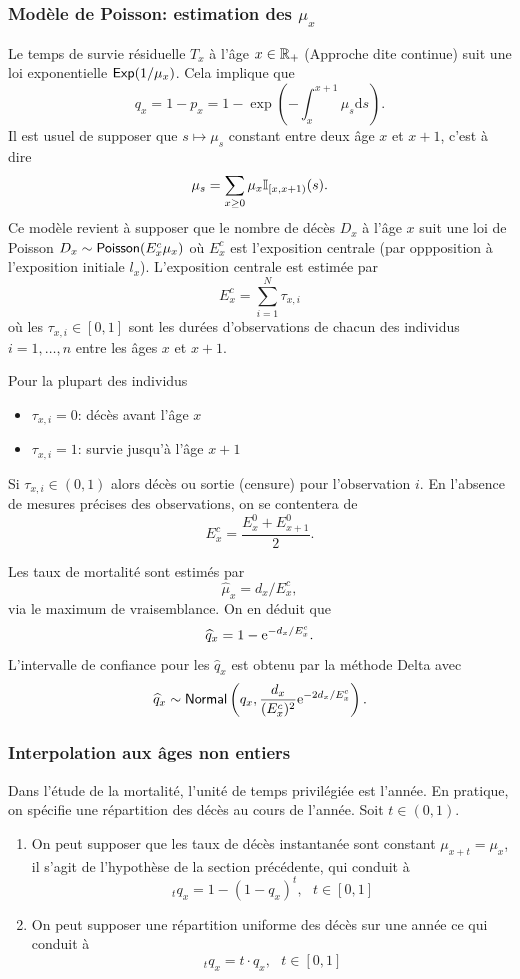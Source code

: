 \subsubsection{Modèle de Poisson: estimation des $\mu_x$}
Le temps de survie résiduelle $T_x$ à l'âge $x\in \mathbb{R}_+$ (Approche dite continue) suit une loi exponentielle $\mathsf{Exp}(1/\mu_x)$. Cela implique que 
$$
q_x = 1-p_x = 1-\exp\left(-\int_{x}^{x+1}\mu_s\text{d}s\right).
$$
Il est usuel de supposer que $s\mapsto \mu_s$ constant entre deux âge $x$ et $x+1$, c'est à dire 
$$
\mu_s = \sum_{x\geq 0}\mu_x\mathbb{I}_{[x,x+1)}(s).
$$
Ce modèle revient à supposer que le nombre de décès $D_x$ à l'âge $x$ suit une loi de Poisson $D_x\sim\mathsf{Poisson}(E_x^c\mu_x)$ où $E_x^c$ est l'exposition centrale (par oppposition à l'exposition initiale $l_x$). L'exposition centrale est estimée par 
$$
E_{x}^c = \sum_{i=1}^N\tau_{x,i}
$$
où les $\tau_{x,i}\in[0,1]$ sont les durées d'observations de chacun des individus $i=1,\ldots, n$ entre les âges $x$ et $x+1$. 
\begin{remark}
Pour la plupart des individus
\begin{itemize}
  \item $\tau_{x,i}=0$: décès avant l'âge $x$
  \item  $\tau_{x,i}=1$: survie jusqu'à l'âge $x+1$
\end{itemize}
Si $\tau_{x,i}\in (0,1)$ alors décès ou sortie (censure) pour l'observation $i$. En l'absence de mesures précises des observations, on se contentera de 
$$
E_{x}^c = \frac{E^0_{x}+E^0_{x+1}}{2}.
$$
\end{remark}
Les taux de mortalité sont estimés par
$$
\widehat{\mu}_x = d_x/E_x^c,
$$
via le maximum de vraisemblance. On en déduit que 
$$
\widehat{q}_x = 1-\mathrm{e}^{-d_x/E_x^c}.
$$
L'intervalle de confiance pour les $\widehat{q}_x$ est obtenu par la méthode Delta avec 
$$
\widehat{q}_x \sim \mathsf{Normal}\left( q_x, \frac{d_x}{(E_x^c)^2}\mathrm{e}^{- 2 d_x/E_x^c}\right).
$$
\subsubsection{Interpolation aux âges non entiers}
Dans l'étude de la mortalité, l'unité de temps privilégiée est l'année. En pratique, on spécifie une répartition des décès au cours de l'année. Soit $t\in(0,1)$.
\begin{enumerate}
  \item On peut supposer que les taux de décès instantanée sont constant $\mu_{x+t} = \mu_x$, il s'agit de l'hypothèse de la section précédente, qui conduit à 
  $$
\,_tq_{x} =1- (1-q_x)^t,\text{ }t\in[0,1]
  $$
  \item On peut supposer une répartition uniforme des décès sur une année ce qui conduit à 
  $$
  \,_tq_x = t\cdot q_x,\text{ }t\in[0,1]
  $$
\end{enumerate}
